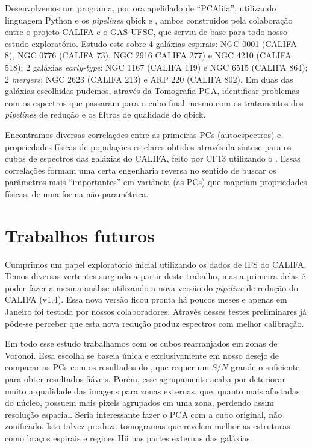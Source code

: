 Desenvolvemos um programa, por ora apelidado de ``PCAlifa'', utilizando linguagem Python e os {\em pipelines} {\sc
qbick} e \pycasso, ambos construidos pela colaboração entre o projeto CALIFA e o GAS-UFSC, que serviu de base para todo
nosso estudo exploratório. Estudo este sobre 4 galáxias espirais: NGC 0001 (CALIFA 8), NGC 0776 (CALIFA 73), NGC 2916
CALIFA 277) e NGC 4210 (CALIFA 518); 2 galáxias {\em early-type}: NGC 1167 (CALIFA 119) e NGC 6515 (CALIFA 864); 2 {\em
mergers}: NGC 2623 (CALIFA 213) e ARP 220 (CALIFA 802). Em duas das galáxias escolhidas pudemos, através da Tomografia
PCA, identificar problemas com os espectros que passaram para o cubo final mesmo com os tratamentos dos {\em pipelines}
de redução e os filtros de qualidade do {\sc qbick}.

Encontramos diversas correlações entre as primeiras PCs (autoespectros) e propriedades físicas de populações estelares
obtidos através da síntese para os cubos de espectros das galáxias do CALIFA, feito por CF13 utilizando o \starlight.
Essas correlações formam uma certa engenharia reversa no sentido de buscar os parâmetros mais ``importantes'' em
variância (as PCs) que mapeiam propriedades físicas, de uma forma não-paramétrica.

\section{Trabalhos futuros}
\label{sec:conclusao:futWorks}

Cumprimos um papel exploratório inicial utilizando os dados de IFS do CALIFA. Temos diversas vertentes surgindo a partir
deste trabalho, mas a primeira delas é poder fazer a mesma análise utilizando a nova versão do {\em pipeline} de redução
do CALIFA (v1.4). Essa nova versão ficou pronta há poucos meses e apenas em Janeiro foi testada por nossos
colaboradores. Através desses testes preliminares já pôde-se perceber que esta nova redução produz espectros com melhor
calibração.

Em todo esse estudo trabalhamos com os cubos rearranjados em zonas de Voronoi. Essa escolha se baseia única e
exclusivamente em nosso desejo de comparar as PCs com os resultados do \starlight, que requer um $S/N$ grande o
suficiente para obter resultados fiáveis. Porém, esse agrupamento acaba por deteriorar muito a qualidade das imagens
para zonas externas, que, quanto mais afastadas do núcleo, possuem mais pixels agrupados em uma zona, perdendo assim
resolução espacial. Seria interessante fazer o PCA com a cubo original, não zonificado. Isto talvez produza tomogramas
que revelem melhor as estruturas como braços espirais e regioes H{\sc ii} nas partes externas das galáxias.

